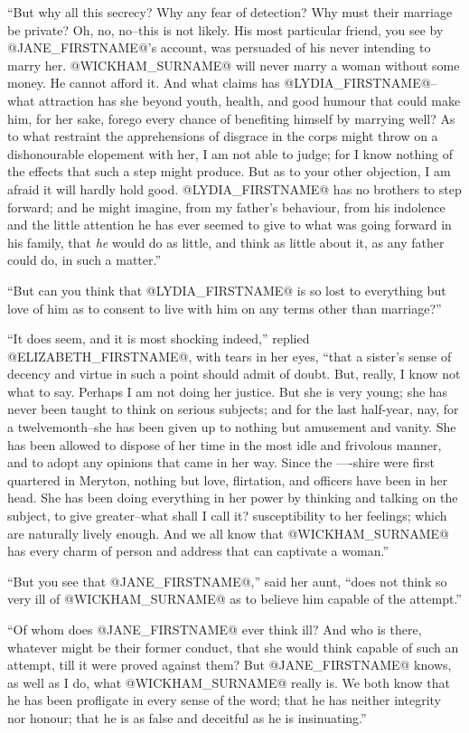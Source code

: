 ``But why all this secrecy? Why any fear of detection? Why must their
marriage be private? Oh, no, no--this is not likely. His most particular
friend, you see by @JANE_FIRSTNAME@'s account, was persuaded of his never intending
to marry her. @WICKHAM_SURNAME@ will never marry a woman without some money. He
cannot afford it. And what claims has @LYDIA_FIRSTNAME@--what attraction has she
beyond youth, health, and good humour that could make him, for her sake,
forego every chance of benefiting himself by marrying well? As to what
restraint the apprehensions of disgrace in the corps might throw on a
dishonourable elopement with her, I am not able to judge; for I know
nothing of the effects that such a step might produce. But as to your
other objection, I am afraid it will hardly hold good. @LYDIA_FIRSTNAME@ has
no brothers to step forward; and he might imagine, from my father's
behaviour, from his indolence and the little attention he has ever
seemed to give to what was going forward in his family, that \textit{he} would
do as little, and think as little about it, as any father could do, in
such a matter.''

``But can you think that @LYDIA_FIRSTNAME@ is so lost to everything but love of him
as to consent to live with him on any terms other than marriage?''

``It does seem, and it is most shocking indeed,'' replied @ELIZABETH_FIRSTNAME@, with
tears in her eyes, ``that a sister's sense of decency and virtue in such
a point should admit of doubt. But, really, I know not what to say.
Perhaps I am not doing her justice. But she is very young; she has never
been taught to think on serious subjects; and for the last half-year,
nay, for a twelvemonth--she has been given up to nothing but amusement
and vanity. She has been allowed to dispose of her time in the most idle
and frivolous manner, and to adopt any opinions that came in her way.
Since the ----shire were first quartered in Meryton, nothing but love,
flirtation, and officers have been in her head. She has been doing
everything in her power by thinking and talking on the subject, to give
greater--what shall I call it? susceptibility to her feelings; which are
naturally lively enough. And we all know that @WICKHAM_SURNAME@ has every charm of
person and address that can captivate a woman.''

``But you see that @JANE_FIRSTNAME@,'' said her aunt, ``does not think so very ill of
@WICKHAM_SURNAME@ as to believe him capable of the attempt.''

``Of whom does @JANE_FIRSTNAME@ ever think ill? And who is there, whatever might be
their former conduct, that she would think capable of such an attempt,
till it were proved against them? But @JANE_FIRSTNAME@ knows, as well as I do, what
@WICKHAM_SURNAME@ really is. We both know that he has been profligate in every
sense of the word; that he has neither integrity nor honour; that he is
as false and deceitful as he is insinuating.''

